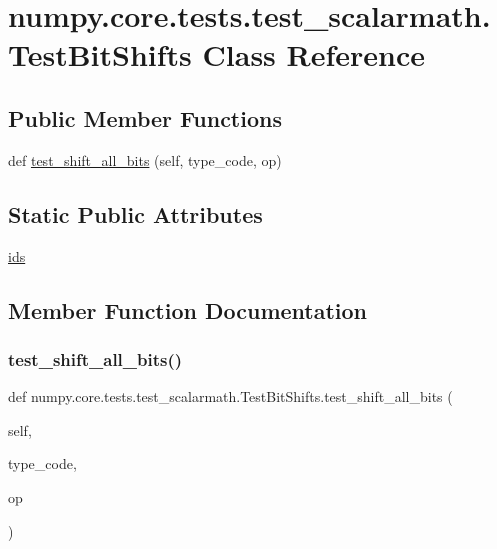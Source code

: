 \hypertarget{classnumpy_1_1core_1_1tests_1_1test__scalarmath_1_1TestBitShifts}{}\section{numpy.\+core.\+tests.\+test\+\_\+scalarmath.\+Test\+Bit\+Shifts Class Reference}
\label{classnumpy_1_1core_1_1tests_1_1test__scalarmath_1_1TestBitShifts}
\subsection*{Public Member Functions}
\begin{DoxyCompactItemize}
\item 
def \hyperlink{classnumpy_1_1core_1_1tests_1_1test__scalarmath_1_1TestBitShifts_ac593e34457c265f99e4d371e1fca2da2}{test\+\_\+shift\+\_\+all\+\_\+bits} (self, type\+\_\+code, op)
\end{DoxyCompactItemize}
\subsection*{Static Public Attributes}
\begin{DoxyCompactItemize}
\item 
\hyperlink{classnumpy_1_1core_1_1tests_1_1test__scalarmath_1_1TestBitShifts_acc63f48bcaf360b96a391e99e02ba415}{ids}
\end{DoxyCompactItemize}


\subsection{Member Function Documentation}
\mbox{\label{classnumpy_1_1core_1_1tests_1_1test__scalarmath_1_1TestBitShifts_ac593e34457c265f99e4d371e1fca2da2}} 
\subsubsection{\texorpdfstring{test\+\_\+shift\+\_\+all\+\_\+bits()}{test\_shift\_all\_bits()}}
{\footnotesize\ttfamily def numpy.\+core.\+tests.\+test\+\_\+scalarmath.\+Test\+Bit\+Shifts.\+test\+\_\+shift\+\_\+all\+\_\+bits (\begin{DoxyParamCaption}\item[{}]{self,  }\item[{}]{type\+\_\+code,  }\item[{}]{op }\end{DoxyParamCaption})}

